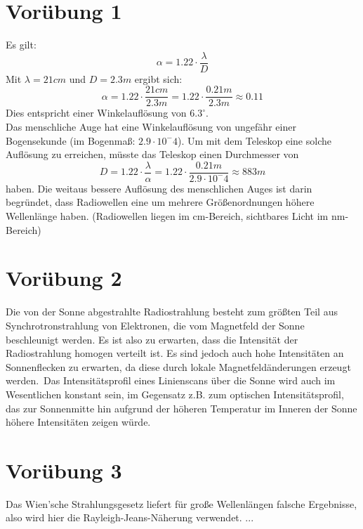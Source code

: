 \documentclass[titlepage]{scrartcl}
\begin{document}
\section{Vorübung 1}
Es gilt:
\begin{equation}
\alpha = 1.22\cdot\frac{\lambda}{D}
\end{equation}
Mit $\lambda=21 cm$ und $D=2.3 m$ ergibt sich:
\begin{equation}
\alpha = 1.22\cdot\frac{21 cm}{2.3 m} = 1.22\cdot\frac{0.21 m}{2.3 m} \approx 0.11
\end{equation}
Dies entspricht einer Winkelauflösung von $6.3^\circ$.
\\
Das menschliche Auge hat eine Winkelauflösung von ungefähr einer Bogensekunde (im Bogenmaß: $2.9\cdot10^-4$). Um mit dem Teleskop eine solche Auflösung zu erreichen, müsste das Teleskop einen Durchmesser von
\begin{equation}
D = 1.22\cdot\frac{\lambda}{\alpha} = 1.22\cdot\frac{0.21 m}{2.9\cdot10^-4} \approx 883 m
\end{equation}
haben. Die weitaus bessere Auflösung des menschlichen Auges ist darin begründet, dass Radiowellen eine um mehrere Größenordnungen höhere Wellenlänge haben. (Radiowellen liegen im cm-Bereich, sichtbares Licht im nm-Bereich)
\section{Vorübung 2}
Die von der Sonne abgestrahlte Radiostrahlung besteht zum größten Teil aus Synchrotronstrahlung von Elektronen, die vom Magnetfeld der Sonne beschleunigt werden. Es ist also zu erwarten, dass die Intensität der Radiostrahlung homogen verteilt ist. Es sind jedoch auch hohe Intensitäten an Sonnenflecken zu erwarten, da diese durch lokale Magnetfeldänderungen erzeugt werden.\
Das Intensitätsprofil eines Linienscans über die Sonne wird auch im Wesentlichen konstant sein, im Gegensatz z.B. zum optischen Intensitätsprofil, das zur Sonnenmitte hin aufgrund der höheren Temperatur im Inneren der Sonne höhere Intensitäten zeigen würde.
\section{Vorübung 3}
Das Wien'sche Strahlungsgesetz liefert für große Wellenlängen falsche Ergebnisse, also wird hier die Rayleigh-Jeans-Näherung verwendet.
...
\end{document}
